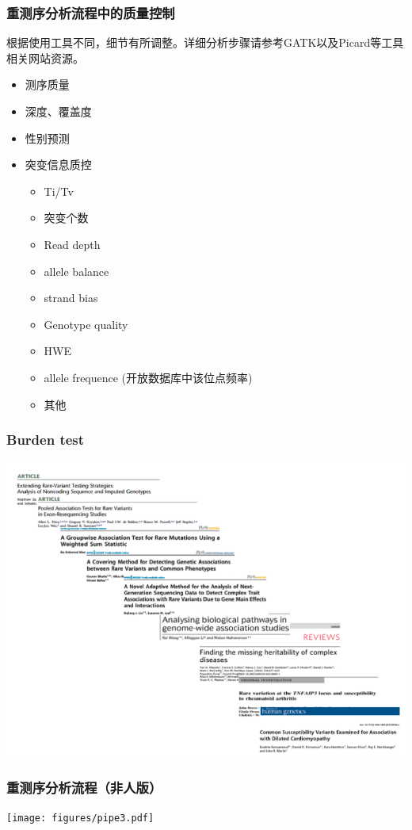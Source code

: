 \documentclass[12pt]{beamer}
\begin{document}
\begin{frame}\frametitle{重测序分析流程中的质量控制}
  根据使用工具不同，细节有所调整。详细分析步骤请参考GATK以及Picard等工具相关网站资源。
  \begin{itemize}
  \item 测序质量
  \item 深度、覆盖度
  \item 性别预测
  \item 突变信息质控
    \begin{itemize}
    \item Ti/Tv
    \item 突变个数
    \item Read depth
    \item allele balance
    \item strand bias
    \item Genotype quality
    \item HWE
    \item allele frequence (开放数据库中该位点频率)
    \item 其他
    \end{itemize}
    \end{itemize}
\end{frame}

\begin{frame}\frametitle{Burden test}
  \includegraphics[width=\textwidth]{figures/burdentest.png}
\end{frame}

\begin{frame}\frametitle{重测序分析流程（非人版）}
  \texttt{[image: figures/pipe3.pdf]}
\end{frame}
\end{document}
